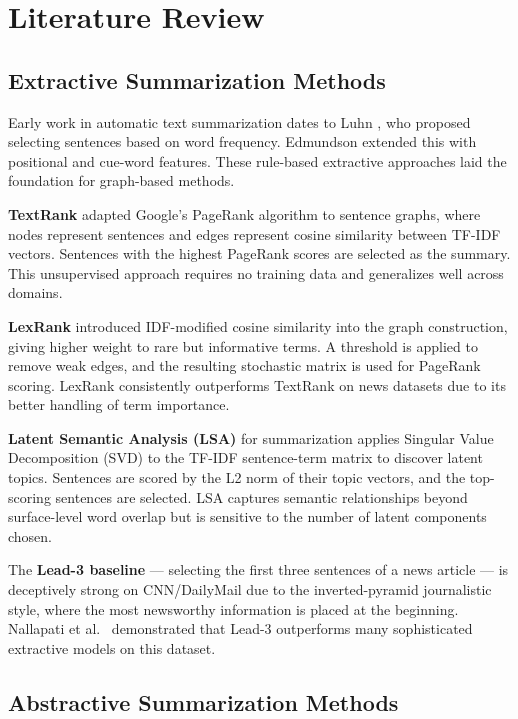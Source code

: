 \documentclass[conference]{IEEEtran}
\begin{document}
\section{Literature Review}
\label{sec:lit}

\subsection{Extractive Summarization Methods}

Early work in automatic text summarization dates to Luhn \cite{luhn1958},
who proposed selecting sentences based on word frequency. Edmundson
\cite{edmundson1969} extended this with positional and cue-word features.
These rule-based extractive approaches laid the foundation for graph-based
methods.

\textbf{TextRank} \cite{mihalcea2004} adapted Google's PageRank algorithm
to sentence graphs, where nodes represent sentences and edges represent
cosine similarity between TF-IDF vectors. Sentences with the highest
PageRank scores are selected as the summary. This unsupervised approach
requires no training data and generalizes well across domains.

\textbf{LexRank} \cite{erkan2004} introduced IDF-modified cosine
similarity into the graph construction, giving higher weight to rare but
informative terms. A threshold is applied to remove weak edges, and the
resulting stochastic matrix is used for PageRank scoring. LexRank
consistently outperforms TextRank on news datasets due to its better
handling of term importance.

\textbf{Latent Semantic Analysis (LSA)} for summarization \cite{gong2001}
applies Singular Value Decomposition (SVD) to the TF-IDF sentence-term
matrix to discover latent topics. Sentences are scored by the L2 norm of
their topic vectors, and the top-scoring sentences are selected. LSA
captures semantic relationships beyond surface-level word overlap but is
sensitive to the number of latent components chosen.

The \textbf{Lead-3 baseline} --- selecting the first three sentences of a
news article --- is deceptively strong on CNN/DailyMail due to the
inverted-pyramid journalistic style, where the most newsworthy information
is placed at the beginning. Nallapati et al.\ \cite{nallapati2016}
demonstrated that Lead-3 outperforms many sophisticated extractive models
on this dataset.

\subsection{Abstractive Summarization Methods}
\end{document}
